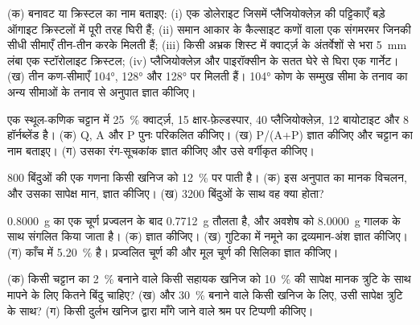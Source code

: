 \begin{exercise}[$\star$]\label{exo:b2:field-lab-methods-2:1}
(क) बनावट या क्रिस्टल का नाम बताइए: (i) एक डोलेराइट जिसमें प्लैजियोक्लेज़ की पट्टिकाएँ बड़े ऑगाइट
क्रिस्टलों में पूरी तरह घिरी हैं; (ii) समान आकार के कैल्साइट कणों वाला एक संगमरमर जिनकी सीधी सीमाएँ तीन-तीन करके
मिलती हैं; (iii) किसी अभ्रक शिस्ट में क्वार्ट्ज़ के अंतर्वेशों से भरा \qty{5}{mm} लंबा एक स्टॉरोलाइट क्रिस्टल;
(iv) प्लैजियोक्लेज़ और पाइरॉक्सीन के सतत घेरे से घिरा एक गार्नेट। (ख) तीन कण-सीमाएँ
\ang{104}, \ang{128} और \ang{128} पर मिलती हैं। \ang{104} कोण के सम्मुख सीमा के तनाव का
अन्य सीमाओं के तनाव से अनुपात ज्ञात कीजिए।
\end{exercise}

\begin{exercise}[$\star$]\label{exo:b2:field-lab-methods-2:2}
एक स्थूल-कणिक चट्टान में \qty{25}{\percent} क्वार्ट्ज़, 15 क्षार-फ़ेल्डस्पार, 40 प्लैजियोक्लेज़, 12
बायोटाइट और 8 हॉर्नब्लेंड है। (क) Q, A और P पुनः परिकलित कीजिए। (ख) P/(A+P) ज्ञात कीजिए और चट्टान का नाम बताइए। (ग) उसका
रंग-सूचकांक ज्ञात कीजिए और उसे वर्गीकृत कीजिए।
\end{exercise}

\begin{exercise}[$\star$]\label{exo:b2:field-lab-methods-2:3}
800 बिंदुओं की एक गणना किसी खनिज को \qty{12}{\percent} पर पाती है। (क) इस अनुपात का मानक विचलन,
और उसका सापेक्ष मान, ज्ञात कीजिए। (ख) 3200 बिंदुओं के साथ वह क्या होता?
\end{exercise}

\begin{exercise}[$\star$]\label{exo:b2:field-lab-methods-2:4}
\qty{0.8000}{g} का एक चूर्ण प्रज्वलन के बाद \qty{0.7712}{g} तौलता है, और अवशेष को
\qty{8.0000}{g} गालक के साथ संगलित किया जाता है। (क)  ज्ञात कीजिए। (ख) गुटिका में नमूने का
द्रव्यमान-अंश ज्ञात कीजिए। (ग) काँच में \qty{5.20}{\percent}  है। प्रज्वलित चूर्ण की
और मूल चूर्ण की सिलिका ज्ञात कीजिए।
\end{exercise}

\begin{exercise}[$\star\star$]\label{exo:b2:field-lab-methods-2:5}
(क) किसी चट्टान का \qty{2}{\percent} बनाने वाले किसी सहायक खनिज को
\qty{10}{\percent} की सापेक्ष मानक त्रुटि के साथ मापने के लिए कितने बिंदु चाहिए? (ख) और \qty{30}{\percent} बनाने वाले किसी खनिज के लिए,
उसी सापेक्ष त्रुटि के साथ? (ग) किसी दुर्लभ खनिज द्वारा माँगे जाने वाले श्रम पर टिप्पणी कीजिए।
\end{exercise}

